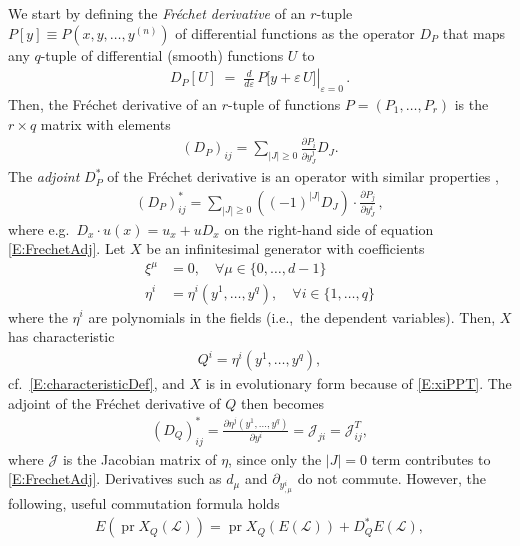 \documentclass[a4paper,hidelinks, 12pt]{article}
\numberwithin{equation}{section}
\theoremstyle{plain}
\newcommand{\mc}{\mathcal}
\newcommand{\on}{\operatorname}
\begin{document}
We start by defining the \textit{Fréchet derivative} \cite{olver1998applications} of an $r$-tuple $P[y]\equiv P(x,y,\ldots,y^{(n)})$ of differential functions as the operator 
$D_P$ that maps any $q$-tuple of differential (smooth) functions $U$ to
\begin{align}
	D_P[U] \;=\; \left.\frac{d}{d\varepsilon}\,P\big[y+\varepsilon\,U\big]\right|_{\varepsilon=0}\,.
\end{align}
Then, the Fréchet derivative of an $r$-tuple of functions $P=(P_1,\ldots,P_r)$ is the $r\times q$ matrix with elements \cite{olver1998applications}
\begin{align}
	(D_P)_{ij}=\sum_{|J|\geq 0} \frac{\partial P_i}{\partial y_J^j}D_J.
\end{align}
The \textit{adjoint} $D_P^\ast$ of the Fréchet derivative is an operator with similar properties \cite{olver1998applications},
\begin{align}\label{E:FrechetAdj}
	(D_P)_{ij}^\ast= \sum_{|J|\geq 0}  ((-1)^{|J|} D_J)\cdot \frac{\partial P_j}{\partial y_J^i}\,,
\end{align}
where e.g.~$D_x \cdot u(x)=u_x+uD_x$ on the right-hand side of equation \eqref{E:FrechetAdj}. Let $X$ be an infinitesimal generator with coefficients
\begin{align}
\xi^\mu &=0, \quad \forall \mu \in\{0,\ldots,d-1 \} \label{E:xiPPT}\\
\eta^i &=\eta^i(y^1,\ldots,y^{q}),	\quad \forall i \in\{1,\ldots,q \} \label{E:etaPPT}
\end{align}
where the $\eta^i$ are polynomials in the fields (i.e.,~the dependent variables).
Then, $X$ has characteristic 
\begin{align}
	Q^i=\eta^i(y^1,\ldots,y^{q}), 
\end{align}
cf.~\eqref{E:characteristicDef}, and $X$ is in evolutionary form because of \eqref{E:xiPPT}.
The adjoint of the Fréchet derivative of $Q$ then becomes  
\begin{align}\label{E:adjFrechetScAff}
	(D_Q)_{ij}^\ast=  \frac{\partial \eta^j(y^1,\ldots,y^{q})}{\partial y^i}=\mc{J}_{ji}=\mc{J}^T_{ij},
\end{align}
where $\mc{J}$ is the Jacobian matrix of $\eta$,
since only the $|J|=0$ term contributes to \eqref{E:FrechetAdj}.
Derivatives such as $d_\mu$ and $\partial_{y^i_{,\mu}}$ do not commute.
However, the following, useful commutation formula holds \cite{olver1998applications}
\begin{align}\label{E:commFrechet}
	E(\on{pr}X_Q(\mc{L}))=\on{pr}X_Q(E(\mc{L}))+D_Q^\ast E(\mc{L}),
\end{align}
\end{document}

